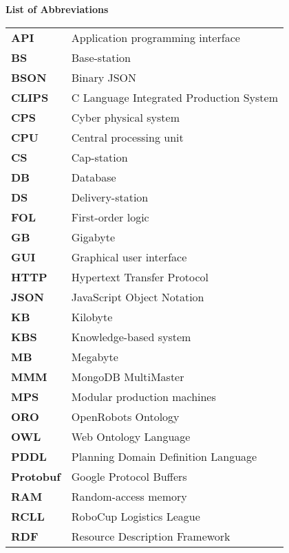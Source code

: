 \newpage

\vspace{-4cm}
\section*{} 
\vspace{3cm}
\textbf{\noindent \Huge List of Abbreviations}
\vspace{1cm}\\
\begin{tabular}{ll}
\textbf{API} & Application programming interface \\
\textbf{BS} &  Base-station\\
\textbf{BSON} & Binary JSON \\
\textbf{CLIPS} &  C Language Integrated Production System \\
\textbf{CPS} & Cyber physical system \\
\textbf{CPU} & Central processing unit \\
\textbf{CS} &  Cap-station\\
\textbf{DB} & Database \\
\textbf{DS} &  Delivery-station\\
\textbf{FOL} & First-order logic \\
\textbf{GB} & Gigabyte \\
\textbf{GUI} & Graphical user interface \\
\textbf{HTTP} & Hypertext Transfer Protocol \\
\textbf{JSON} & JavaScript Object Notation \\
\textbf{KB} & Kilobyte \\
\textbf{KBS} & Knowledge-based system \\
\textbf{MB} & Megabyte \\
\textbf{MMM} & MongoDB MultiMaster \\
\textbf{MPS} &  Modular production machines\\
\textbf{ORO} & OpenRobots Ontology \\
\textbf{OWL} & Web Ontology Language \\
\textbf{PDDL} & Planning Domain Definition Language \\
\textbf{Protobuf} &  Google Protocol Buffers\\
\textbf{RAM} & Random-access memory \\
\textbf{RCLL} & RoboCup Logistics League \\
\textbf{RDF} & Resource Description Framework \\

\end{tabular}
